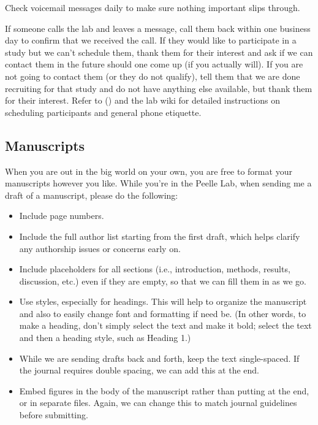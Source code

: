 \documentclass[letterpaper,12pt,oneside]{memoir}
\begin{document}
Check voicemail messages daily to make sure nothing important slips through.

If someone calls the lab and leaves a message, call them back within one business day to confirm that we received the call. If they would like to participate in a study but we can't schedule them, thank them for their interest and ask if we can contact them in the future should one come up (if you actually will). If you are not going to contact them (or they do not qualify), tell them that we are done recruiting for that study and do not have anything else available, but thank them for their interest. Refer to  () and the lab wiki for detailed instructions on scheduling participants and general phone etiquette.


\subsection{Manuscripts}

When you are out in the big world on your own, you are free to format your manuscripts however you like. While you're in the Peelle Lab, when sending me a draft of a manuscript, please do the following:

\begin{itemize}
\item Include page numbers.
\item Include the full author list starting from the first draft, which helps clarify any authorship issues or concerns early on.
\item Include placeholders for all sections (i.e., introduction, methods, results, discussion, etc.) even if they are empty, so that we can fill them in as we go.
\item Use styles, especially for headings. This will help to organize the manuscript and also to easily change font and formatting if need be. (In other words, to make a heading, don't simply select the text and make it bold; select the text and then a heading style, such as Heading 1.)
\item While we are sending drafts back and forth, keep the text single-spaced. If the journal requires double spacing, we can add this at the end.
\item Embed figures in the body of the manuscript rather than putting at the end, or in separate files. Again, we can change this to match journal guidelines before submitting.
\end{itemize}
\end{document}
